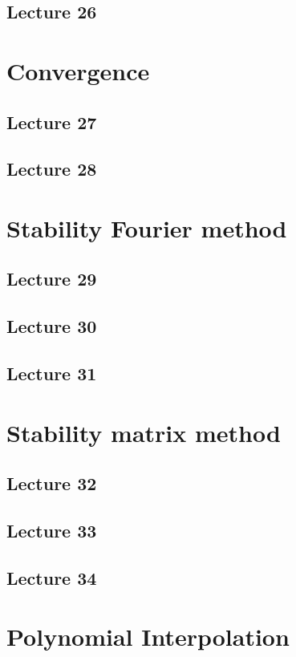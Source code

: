 \documentclass{article}
\begin{document}
\subsection{Lecture 26}


\section{Convergence}
\subsection{Lecture 27}
\subsection{Lecture 28}


\section{Stability Fourier method}
\subsection{Lecture 29}
\subsection{Lecture 30}
\subsection{Lecture 31}


\section{Stability matrix method}
\subsection{Lecture 32}
\subsection{Lecture 33}
\subsection{Lecture 34}


\section{Polynomial Interpolation}
\end{document}
